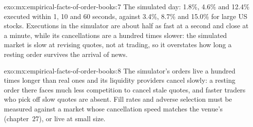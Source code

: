 \begin{solution}{exo:mx:empirical-facts-of-order-books:7}
The simulated day: 1.8\%, 4.6\% and 12.4\% executed within 1, 10 and 60 seconds, against 3.4\%, 8.7\% and 15.0\% for large US stocks. Executions in the
simulator are about half as fast at a second and close at a minute, while its cancellations are a hundred times slower: the simulated market is slow at
revising quotes, not at trading, so it overstates how long a resting order survives the arrival of news.
\end{solution}

\begin{solution}{exo:mx:empirical-facts-of-order-books:8}
The simulator's orders live a hundred times longer than real ones and its liquidity providers cancel slowly: a resting order there faces much less
competition to cancel stale quotes, and faster traders who pick off slow quotes are absent. Fill rates and adverse selection must be measured against a
market whose cancellation speed matches the venue's (chapter~27), or live at small size.
\end{solution}

